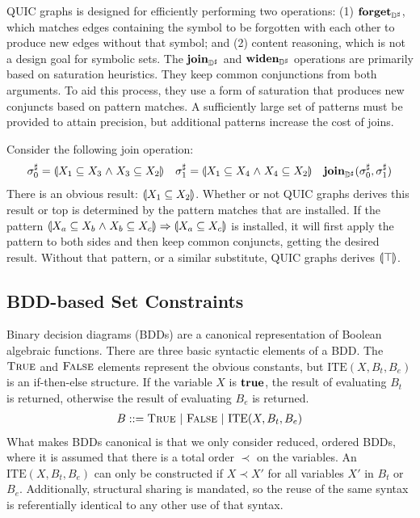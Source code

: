 QUIC graphs is designed for efficiently performing two operations:
(1) $\textbf{forget}_{{\mathbb{D}}^{\sharp}}$, which matches edges containing the symbol to be
forgotten with each other to produce new edges without that symbol; and
(2) content reasoning, which is not a design goal for symbolic sets.
The $\textbf{join}_{{\mathbb{D}}^{\sharp}}$ and $\textbf{widen}_{{\mathbb{D}}^{\sharp}}$ operations are primarily based on
saturation heuristics.
They keep common conjunctions from both arguments.
To aid this process, they use a form of saturation that produces new
conjuncts based on pattern matches.
A sufficiently large set of patterns must be provided to attain precision,
but additional patterns increase the cost of joins.
\begin{example} \label{ex:Qjoin}  Consider the following join operation:
    \begin{align*}
      {\sigma}^{\sharp}_0 &= \llparenthesis X_1 \subseteq X_3 \mathrel{\wedge} X_3 \subseteq X_2 \rrparenthesis &
      {\sigma}^{\sharp}_1 &= \llparenthesis X_1 \subseteq X_4 \mathrel{\wedge} X_4 \subseteq X_2 \rrparenthesis &
      \textbf{join}_{{\mathbb{D}}^{\sharp}}({\sigma}^{\sharp}_0, {\sigma}^{\sharp}_1 )
    \end{align*}
    There is an obvious result: $\llparenthesis X_1 \subseteq X_2 \rrparenthesis$.  Whether or not QUIC graphs derives this result or top is determined by the pattern matches that are installed.  If the pattern $\llparenthesis X_a \subseteq X_b \mathrel{\wedge} X_b \subseteq X_c \rrparenthesis \Rightarrow \llparenthesis X_a \subseteq X_c \rrparenthesis$ is installed, it will first apply the pattern to both sides and then keep common conjuncts, getting the desired result.  Without that pattern, or a similar substitute, QUIC graphs derives $\llparenthesis \top \rrparenthesis$.
\end{example}

\subsection{BDD-based Set Constraints}
\label{s:4:3:bdd}
Binary decision diagrams (BDDs) are a canonical representation of Boolean algebraic functions.  There are three basic syntactic elements of a BDD.  The $\textsc{True}$ and $\textsc{False}$ elements represent the obvious constants, but $\textrm{ITE}(X,B_t,B_e)$ is an if-then-else structure.  If the variable $X$ is $\mathbf{true}$, the result of evaluating $B_t$ is returned, otherwise the result of evaluating $B_e$ is returned.
\begin{align*}
  B ::= \textsc{True} \ | \ \textsc{False} \ | \ \textrm{ITE}(X,B_t,B_e)
\end{align*}
What makes BDDs canonical is that we only consider reduced, ordered BDDs, where it is assumed that there is a total order $\prec$ on the variables.  An $\textrm{ITE}(X,B_t,B_e)$ can only be constructed if $X \prec X'$ for all variables $X'$ in $B_t$ or $B_e$.  Additionally, structural sharing is mandated, so the reuse of the same syntax is referentially identical to any other use of that syntax.

